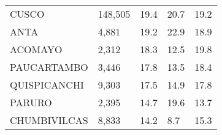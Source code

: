 \begin{tabular}{lllll}
	\cellcolor[HTML]{FF5050}CUSCO                                  & 148,505                                                               & 19.4                                                                             & 20.7                                                                        & 19.2                                                                                \\
	\cellcolor[HTML]{FF5050}ANTA                                   & 4,881                                                                 & 19.2                                                                             & 22.9                                                                        & 18.9                                                                                \\
	\cellcolor[HTML]{FF5050}ACOMAYO                                & 2,312                                                                 & 18.3                                                                             & 12.5                                                                        & 19.8                                                                                \\
	\cellcolor[HTML]{FF5050}PAUCARTAMBO                            & 3,446                                                                 & 17.8                                                                             & 13.5                                                                        & 18.4                                                                                \\
	\cellcolor[HTML]{FF5050}QUISPICANCHI                           & 9,303                                                                 & 17.5                                                                             & 14.9                                                                        & 17.8                                                                                \\
	\cellcolor[HTML]{FF5050}PARURO                                 & 2,395                                                                 & 14.7                                                                             & 19.6                                                                        & 13.7                                                                                \\
	\cellcolor[HTML]{FF5050}CHUMBIVILCAS                           & 8,833                                                                 & 14.2                                                                             & 8.7                                                                         & 15.3                                                                                \\

\end{tabular}
